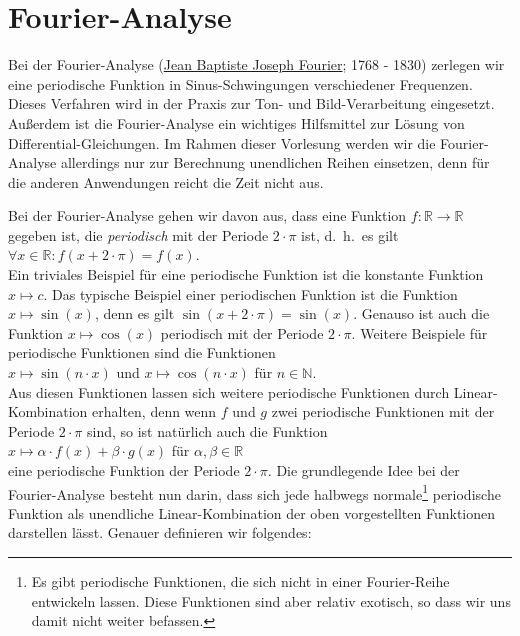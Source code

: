 \chapter{Fourier-Analyse}
Bei der Fourier-Analyse 
(\href{http://de.wikipedia.org/wiki/Joseph_Fourier}{Jean Baptiste Joseph Fourier}; 1768 - 1830) 
zerlegen wir eine 
periodische Funktion in Sinus-Schwingungen verschiedener Frequenzen.  Dieses Verfahren
wird in der Praxis zur Ton- und Bild-Verarbeitung eingesetzt.  Au{\ss}erdem ist die
Fourier-Analyse ein wichtiges Hilfsmittel zur L\"osung von Differential-Gleichungen.
Im Rahmen dieser Vorlesung werden wir die Fourier-Analyse allerdings nur zur Berechnung
unendlichen Reihen einsetzen, denn f\"ur die anderen Anwendungen reicht die Zeit 
nicht aus.

Bei der Fourier-Analyse gehen wir davon aus, dass eine Funktion 
$f:\mathbb{R} \rightarrow \mathbb{R}$ gegeben ist, die \emph{periodisch} mit der
Periode $2\cdot\pi$ ist, d.~h.~es gilt
\\[0.1cm]
\hspace*{1.3cm}
$\forall x \in\mathbb{R}: f(x+2\cdot\pi) = f(x)$.
\\[0.1cm]
Ein triviales Beispiel f\"ur eine periodische Funktion ist die konstante Funktion 
$x \mapsto c$.
Das typische Beispiel einer periodischen Funktion ist die Funktion
$x \mapsto \sin(x)$, denn es gilt $\sin(x+2\cdot\pi) = \sin(x)$.  Genauso ist auch die
Funktion $x \mapsto \cos(x)$ periodisch mit der Periode $2\cdot\pi$. 
Weitere Beispiele f\"ur periodische Funktionen sind die Funktionen 
\\[0.1cm]
\hspace*{1.3cm}
$x \mapsto \sin(n\cdot x)$ \quad und \quad $x \mapsto \cos(n\cdot x)$ 
\quad f\"ur $n\in\mathbb{N}$.
\\[0.1cm]
Aus diesen Funktionen lassen sich weitere periodische Funktionen durch Linear-Kombination
erhalten, denn wenn $f$ und $g$ zwei periodische Funktionen mit der Periode $2\cdot\pi$
sind, so ist nat\"urlich auch die Funktion
\\[0.1cm]
\hspace*{1.3cm}
$x \mapsto \alpha \cdot f(x) + \beta \cdot g(x)$ \quad f\"ur $\alpha,\beta\in\mathbb{R}$
\\[0.1cm] 
eine periodische Funktion der Periode $2\cdot\pi$.  Die grundlegende Idee bei der
Fourier-Analyse besteht nun darin, dass sich jede halbwegs normale\footnote{
Es gibt periodische Funktionen, die sich nicht in einer Fourier-Reihe entwickeln
lassen.  Diese Funktionen sind aber relativ exotisch, so dass wir uns damit nicht weiter
befassen. 
}
periodische Funktion als unendliche Linear-Kombination der oben vorgestellten Funktionen
darstellen l\"asst.  Genauer definieren wir folgendes: 

